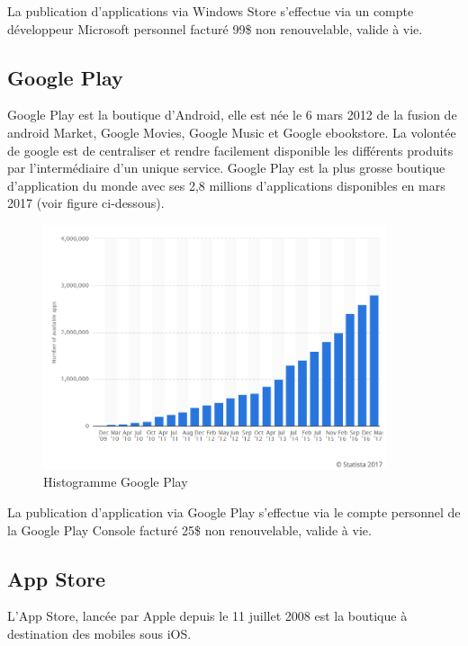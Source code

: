 \documentclass[11]{article}
\begin{document}
 \vspace{0.5cm}
 
La publication d’applications via Windows Store s’effectue via un compte développeur Microsoft personnel facturé 99\$ non renouvelable, valide à vie.

\subsection{Google Play}
Google Play est la boutique d’Android, elle est née le 6 mars 2012 de la fusion de android Market, Google Movies, Google Music et Google ebookstore. La volontée de google est de centraliser et rendre facilement disponible les différents produits par l’intermédiaire d’un unique service. Google Play est la plus grosse boutique d’application du monde avec ses 2,8 millions d’applications disponibles en mars 2017 (voir figure ci-dessous).

\begin{figure}[h]
    \centering
    \includegraphics[width=0.9\textwidth]{histo-google}
    \caption{Histogramme Google Play}
    \label{bat}
\end{figure}
   
 \vspace{0.5cm}
 
La publication d’application via Google Play s’effectue via le compte personnel de la Google Play Console facturé 25\$ non renouvelable, valide à vie.

\subsection{App Store}
L’App Store, lancée par Apple depuis le 11 juillet 2008 est la boutique à destination des mobiles sous iOS.
    
\end{document}

